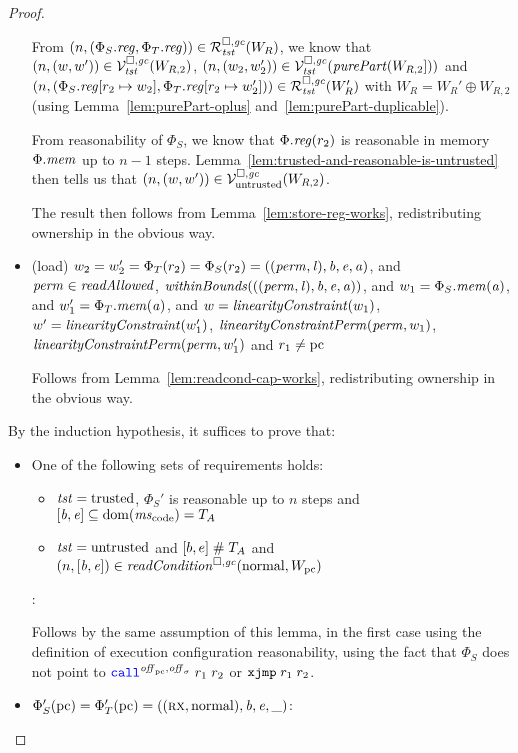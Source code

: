 \begin{proof}
\begin{itemize}
    From $\npair{(\Phi_S.\reg,\Phi_T.\reg)} \in \lrrg{\trust}(W_R)$, we know that $\left(n,(w,w')\right) \in \mathcal{V}^{\square,\mathit{gc}}_{\mathit{tst}}(W_{R,2})$, $\npair{(w_2,w_2')} \in \lrvg{\trust}(\purePart{W_{R,2}]})$ and $\npair{(\Phi_S.\reg\update{r_2}{w_2},\Phi_T.\reg\update{r_2}{w_2'})} \in \lrrg{\trust}(W_R')$ with $W_R =W_R' \oplus W_{R,2}$ (using Lemma~\ref{lem:purePart-oplus} and~\ref{lem:purePart-duplicable}).

    From reasonability of $\Phi_S$, we know that $\Phi.\reg(r_2)$ is reasonable in memory $\Phi.\mathit{mem}$ up to $n-1$ steps.
    Lemma~\ref{lem:trusted-and-reasonable-is-untrusted} then tells us that $\left(n,(w,w')\right) \in \mathcal{V}^{\square,\mathit{gc}}_{\mathrm{untrusted}}(W_{R,2})$.

    The result then follows from Lemma~\ref{lem:store-reg-works}, redistributing ownership in the obvious way.

  \item (load) $w_2 = w_2' = \Phi_T(r_2) = \Phi_S(r_2) =
    ((\mathit{perm},\mathit{l}),\mathit{b},\mathit{e},\mathit{a})$, and $\perm \in \readAllowed{}$,
    $\withinBounds{((\perm,\lin),\baddr,\eaddr,\aaddr)}$, and
    $w_1 = \Phi_S.\mathit{mem}(\mathit{a})$, and $w_1' = \Phi_T.\mathit{mem}(\mathit{a})$, and
    $w = \linCons{w_1}$, $w' = \linCons{w_1'}$, $\linConsPerm{\perm}{w_1}$, $\linConsPerm{\perm}{w_1'}$ and $r_1 \neq \mathrm{pc}$

    Follows from Lemma~\ref{lem:readcond-cap-works}, redistributing ownership in the obvious way.

  \end{itemize}

  By the induction hypothesis, it suffices to prove that:
  \begin{itemize}
  \item One of the following sets of requirements holds:
    \begin{itemize}
    \item $\mathit{tst} = \mathrm{trusted}$, $\Phi_S'$ is reasonable up to $n$ steps and $[\baddr,\eaddr] \subseteq \dom(\mscode) = \ta$
    \item $\mathit{tst} = \mathrm{untrusted}$ and $[b,e] \mathrel{\#} T_{A}$ and $\npair{[\baddr,\eaddr]} \in \readCond{\normal,W_\pcreg}$
    \end{itemize}:

    Follows by the same assumption of this lemma, in the first case using the definition of execution configuration reasonability, using the fact that $\Phi_S$ does not point to $\scall{\offpc,\offsigma}{r_1}{r_2}$ or $\txjmp{r_1}{r_2}$.

  \item $\Phi_S'(\mathrm{pc}) = \Phi_T'(\mathrm{pc}) = ((\textsc{rx},\mathrm{normal}),\mathit{b},\mathit{e},\_)$:


\end{itemize}
\end{proof}
